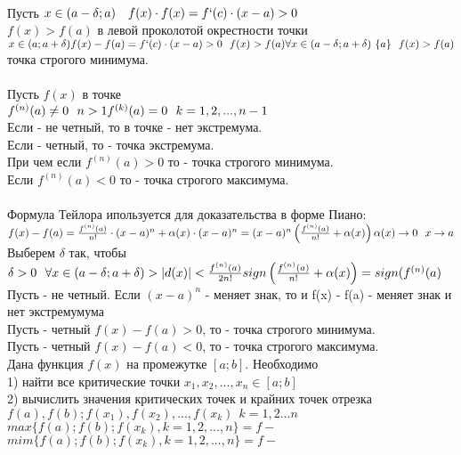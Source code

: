  \\
Пусть $x \in (a - \delta; a) \quad f(x) \cdot f(x) = f`(c) \cdot (x - a) > 0 $ \\  %
$f(x) > f(a)$ в левой проколотой окрестности точки  \\
$x \in (a; a + \delta) \\
f(x) - f(a) = f`(c) \cdot (x - a) > 0 ~~ f(x) > f(a) \\
\forall x \in (a - \delta; a+ \delta) \ \{a\} ~~ f(x) > f(a)$ \\
точка строгого минимума. \\

 \\
Пусть $f(x)$ в точке  \\
$f^{(n)} (a) \neq 0 ~~ n > 1 \\
f^{(k)} (a) = 0 ~~ k = 1, 2, ..., n-1$ \\
Если  - не четный, то в точке  - нет экстремума. \\
Если  - четный, то  - точка экстремума. \\
При чем если $f^{(n)} (a) > 0$ то  - точка строгого минимума. \\
Если  $f^{(n)} (a) < 0$ то  - точка строгого максимума. \\

 \\
Формула Тейлора ипользуется для доказательства в форме Пиано: \\
$f(x) - f(a) = \frac {f^{(n)} (a)} {n!} \cdot (x - a)^n + \alpha (x) \cdot (x - a)^n = (x - a)^n \left ( \frac {f^{(n)} (a)} { n!} + \alpha(x) \right) \\
\alpha (x) \to 0 ~~ x \to a$ \\
Выберем $\delta$ так, чтобы $\delta > 0 ~~ \forall x \in (a - \delta; a + \delta) > |d(x)| < \frac {f^{(n)}(a)}{2n!} \\
sign \left ( \frac {f^{(n)} (a)} {n!} + \alpha(x) \right) = sign (f^{(n)} (a)$ \\
Пусть  - не четный. Если $(x - a)^n$ - меняет знак, то и f(x) - f(a) - меняет знак и нет экстремумума \\
Пусть  - четный $f(x) - f(a) > 0$, то  - точка строгого минимума. \\
Пусть  - четный $f(x) - f(a) < 0$, то  - точка строгого максимума. \\

Дана функция $f(x)$ на промежутке $[a;b]$. Необходимо \\
1) найти все критические точки $x_{1}, x_{2}, ..., x_{n} \in [a; b]$ \\
2) вычислить значения критических точек и крайних точек отрезка
$f(a), f(b); f(x_{1}), f(x_{2}), ..., f(x_{k}) ~~ k = 1, 2 ... n$ \\

$max \{f(a); f(b); f(x_{k}), k = 1, 2, ..., n\} = f - $  \\
$mim \{f(a); f(b); f(x_{k}), k = 1, 2, ..., n\} = f - $  \\